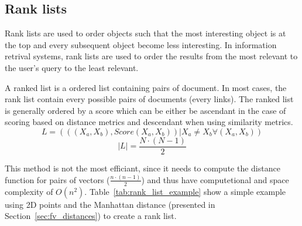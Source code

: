 \subsection{Rank lists}

Rank lists are used to order objects such that the most interesting object is at the top and every subsequent object become less interesting.
In information retrival systems, rank lists are used to order the results from the most relevant to the user's query to the least relevant.

\begin{definition}
  A ranked list is a ordered list containing pairs of document.
  In most cases, the rank list contain every possible pairs of documents (every links).
  The ranked list is generally ordered by a score which can be either be ascendant in the case of scoring based on distance metrics and descendant when using similarity metrics.
  \begin{equation}
    L = (((X_a, X_b), Score(X_a, X_b)) | X_a \neq X_b \forall (X_a, X_b))
  \end{equation}
  \begin{equation}
    |L| = \frac{N \cdot (N - 1)}{2}
  \end{equation}
\end{definition}

This method is not the most efficiant, since it needs to compute the distance function for pairs of vectors ($\frac{n \cdot (n - 1)}{2}$) and thus have computetional and space complexity of $O(n^2)$.
Table~\ref{tab:rank_list_example} show a simple example using 2D points and the Manhattan distance (presented in Section~\ref{sec:fv_distances}) to create a rank list.

